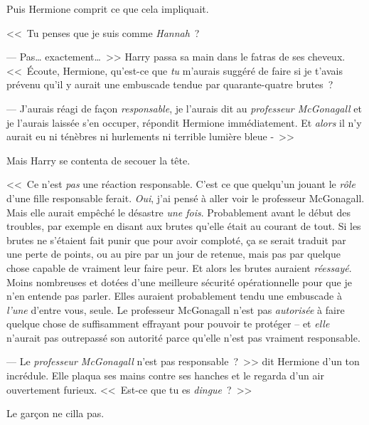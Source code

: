 Puis Hermione comprit ce que cela impliquait.

<<~Tu penses que je suis comme \emph{Hannah}~?

--- Pas… exactement…~>> Harry passa sa main dans le fatras de ses cheveux. <<~Écoute, Hermione, qu'est-ce que \emph{tu} m'aurais suggéré de faire si je t'avais prévenu qu'il y aurait une embuscade tendue par quarante-quatre brutes~?

--- J'aurais réagi de façon \emph{responsable}, je l'aurais dit au \emph{professeur McGonagall} et je l'aurais laissée s'en occuper, répondit Hermione immédiatement. Et \emph{alors} il n'y aurait eu ni ténèbres ni hurlements ni terrible lumière bleue -~>>

Mais Harry se contenta de secouer la tête.

<<~Ce n'est \emph{pas} une réaction responsable. C'est ce que quelqu'un jouant le \emph{rôle} d'une fille responsable ferait. \emph{Oui}, j'ai pensé à aller voir le professeur McGonagall. Mais elle aurait empêché le désastre \emph{une fois}. Probablement avant le début des troubles, par exemple en disant aux brutes qu'elle était au courant de tout. Si les brutes ne s'étaient fait punir que pour avoir comploté, ça se serait traduit par une perte de points, ou au pire par un jour de retenue, mais pas par quelque chose capable de vraiment leur faire peur. Et alors les brutes auraient \emph{réessayé}. Moins nombreuses et dotées d'une meilleure sécurité opérationnelle pour que je n'en entende pas parler. Elles auraient probablement tendu une embuscade à \emph{l'une} d'entre vous, seule. Le professeur McGonagall n'est pas \emph{autorisée} à faire quelque chose de suffisamment effrayant pour pouvoir te protéger -- et \emph{elle} n'aurait pas outrepassé son autorité parce qu'elle n'est pas vraiment responsable.

--- Le \emph{professeur McGonagall} n'est pas responsable~?~>> dit Hermione d'un ton incrédule. Elle plaqua ses mains contre ses hanches et le regarda d'un air ouvertement furieux. <<~Est-ce que tu es \emph{dingue}~?~>>

Le garçon ne cilla pas.

